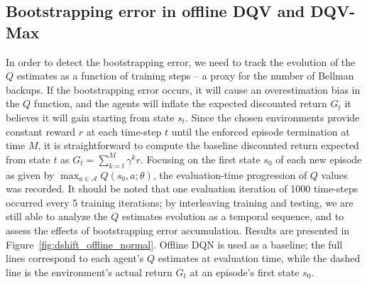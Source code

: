 \subsection{Bootstrapping error in offline DQV and
  DQV-Max}\label{sec:methods_be_dqv_dqvmax}
In order to detect the bootstrapping error, we need to track the
evolution of the $Q$ estimates as a function of training steps -- a
proxy for the number of Bellman backups. If the
bootstrapping error occurs, it will cause an overestimation bias in
the $Q$ function, and the agents will inflate the expected discounted
return $G_t$ it believes it will gain starting from state $s_t$. Since
the
chosen environments provide constant reward $r$ at each time-step $t$
until the enforced episode termination at time $M$, it is
straightforward to compute the baseline discounted return expected
from state $t$ as $G_t=\sum^{M}_{k=t}\gamma^{k}r$.
Focusing on the first state $s_0$ of each new episode as given by
$\max_{a\in\mathcal{A}}Q\left(s_0,a;\theta\right)$, the
evaluation-time progression of $Q$ values was recorded.
It should be
noted that one evaluation iteration of 1000 time-steps occurred every
5 training iterations; by interleaving training and testing, we are
still able to analyze the $Q$ estimates evolution as a temporal
sequence, and to assess the effects of bootstrapping error
accumulation. Results are presented in
Figure~\ref{fig:dshift_offline_normal}.
Offline DQN is used as a baseline; the full lines correspond to each
agent's $Q$ estimates at evaluation time, while the dashed line is the
environment's actual return $G_t$ at an episode's first state $s_0$.

